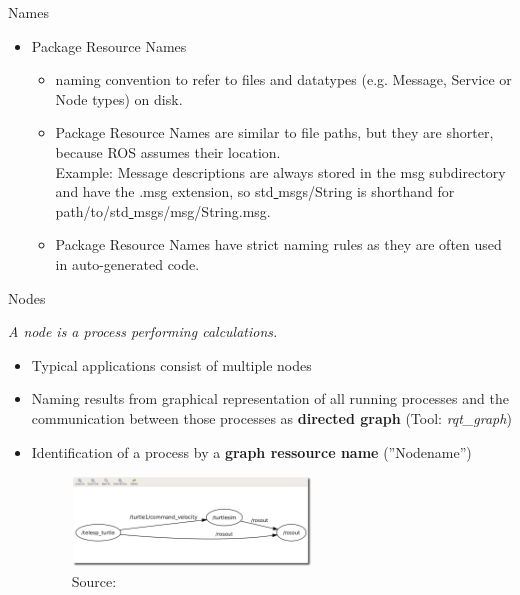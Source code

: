 \documentclass{beamer}
\begin{document}
\begin{frame}{Names}
	\begin{itemize}
		\item Package Resource Names
		
		\begin{itemize}
			\item naming convention to refer to files and datatypes (e.g. Message, Service or Node types) on disk. 
			\item Package Resource Names are similar to file paths, but they are shorter, because ROS assumes their location. \\
			Example: Message descriptions are always stored in the msg subdirectory and have the .msg extension, so std\underline{ }msgs/String is shorthand for path/to/std\underline{ }msgs/msg/String.msg.
			\item Package Resource Names have strict naming rules as they are often used in auto-generated code. 
		\end{itemize}
		
	\end{itemize}
		
\end{frame}

\begin{frame}{Nodes}
	\begin{definition}[Node]
		\textit{A node is a process performing calculations.}
	\end{definition}
	
	\begin{itemize}
		\item Typical applications consist of multiple nodes
		\item Naming results from graphical representation of all running processes and the communication between those processes as \textbf{directed graph} (Tool: \textit{rqt\_graph})
		\item Identification of a process by a \textbf{graph ressource name} (''Nodename'')
		\begin{figure}[H]
			\centering
			\includegraphics[width=0.6\textwidth]{rxgraph-turtle-key.png}
			\caption{Source: \cite{ROS:2015:Online}}
			\label{fig:ros_graph}
		\end{figure}
	\end{itemize}
\end{frame}
\end{document}
